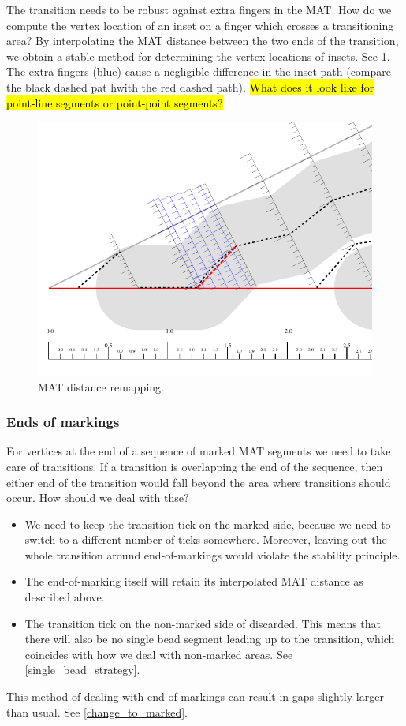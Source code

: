The transition needs to be robust against extra fingers in the MAT.
How do we compute the vertex location of an inset on a finger which crosses a transitioning area?
By interpolating the MAT distance between the two ends of the transition, we obtain a stable method for determining the vertex locations of insets.
See \cref{distance_rounding_transition}.
The extra fingers (blue) cause a negligible difference in the inset path (compare the black dashed pat hwith the red dashed path).
\hl{What does it look like for point-line segments or point-point segments?}

\begin{figure}
\centering
\includegraphics[width=.9\columnwidth]{sources/method/distance_rounding_transition.pdf}
\caption{MAT distance remapping.}
\label{distance_rounding_transition}
\end{figure}


\subsubsection{Ends of markings}
For vertices at the end of a sequence of marked MAT segments we need to take care of transitions.
If a transition is overlapping the end of the sequence, then either end of the transition would fall beyond the area where transitions should occur.
How should we deal with thse?
\begin{itemize}
\item We need to keep the transition tick on the marked side, because we need to switch to a different number of ticks somewhere.
Moreover, leaving out the whole transition around end-of-markings would violate the stability principle.
\item The end-of-marking itself will retain its interpolated MAT distance as described above.
\item The transition tick on the non-marked side of discarded.
This means that there will also be no single bead segment leading up to the transition, which coincides with how we deal with non-marked areas.
See \cref{single_bead_strategy}.
\end{itemize}
This method of dealing with end-of-markings can result in gaps slightly larger than usual.
See \cref{change_to_marked}.

